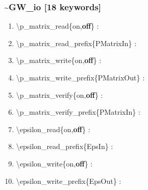 \documentclass[letterpaper,12pt]{article}
\begin{document}
\subsubsection*{\bf \~{}GW\_io [18 keywords]}
\begin{enumerate}

 \vspace{0.15in}
 \item   \textbackslash{}p\_matrix\_read\{on,{\bf off}\} : \\
 
\vspace{0.15in}
 \item   \textbackslash{}p\_matrix\_read\_prefix\{PMatrixIn\} : \\

 \vspace{0.15in}
 \item   \textbackslash{}p\_matrix\_write\{on,{\bf off}\} : \\
 
\vspace{0.15in}
 \item   \textbackslash{}p\_matrix\_write\_prefix\{PMatrixOut\} : \\

 \vspace{0.15in}
 \item   \textbackslash{}p\_matrix\_verify\{on,{\bf off}\} : \\
 
\vspace{0.15in}
 \item   \textbackslash{}p\_matrix\_verify\_prefix\{PMatrixIn\} : \\

 \vspace{0.15in}
 \item   \textbackslash{}epsilon\_read\{on,{\bf off}\} : \\
 
\vspace{0.15in}
 \item   \textbackslash{}epsilon\_read\_prefix\{EpsIn\} : \\

 \vspace{0.15in}
 \item   \textbackslash{}epsilon\_write\{on,{\bf off}\} : \\
 
\vspace{0.15in}
 \item   \textbackslash{}epsilon\_write\_prefix\{EpsOut\} : \\


\end{enumerate}
\end{document}
